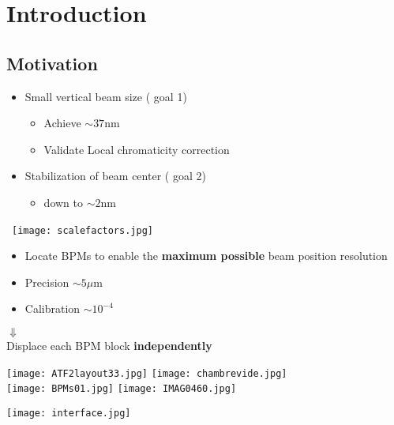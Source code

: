 \chapter{Introduction}
\section{Motivation}
{\Large
 \begin{itemize}
  \item Small vertical beam size ({\color{red} goal 1})
  \begin{itemize}
   \item Achieve $\sim 37$nm
   \item Validate Local chromaticity correction
  \end{itemize}
  \item Stabilization of beam center ({\color{blue} goal 2})
  \begin{itemize}
   \item down to $\sim2$nm
  \end{itemize}
 \end{itemize}
}
 $\,$
  \texttt{[image: scalefactors.jpg]}
{\LARGE
  \begin{itemize}
   \item Locate BPMs to enable the \textbf{ maximum possible} beam position resolution
   \item Precision $\sim 5\mu$m
   \item Calibration $\sim 10^{-4}$
  \end{itemize}
 \hspace*{5cm}$\Downarrow$\\
 Displace each BPM block \textbf{independently}
 }\par
\texttt{[image: ATF2layout33.jpg]}
\hspace{1cm}
\texttt{[image: chambrevide.jpg]}\\
\hspace*{1cm}\texttt{[image: BPMs01.jpg]}\hspace*{0.2cm}
\texttt{[image: IMAG0460.jpg]}\par
\texttt{[image: interface.jpg]}

